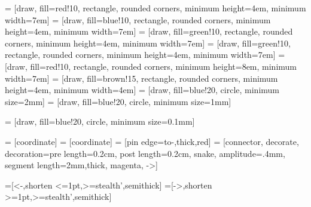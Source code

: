 \documentclass[runningheads]{llncs}
\newcommand{\0}{0}
\newcommand{\1}{1}
\begin{document}
 = [draw, fill=red!10, rectangle, rounded corners,
minimum height=4em, minimum width=7em]
 = [draw, fill=blue!10, rectangle, rounded corners,
minimum height=4em, minimum width=7em]
 = [draw, fill=green!10, rectangle, rounded corners,
minimum height=4em, minimum width=7em]
 = [draw, fill=green!10, rectangle, rounded corners,
minimum height=4em, minimum width=7em]
 = [draw, fill=red!10, rectangle, rounded corners,
minimum height=8em, minimum width=7em]
 = [draw, fill=brown!15, rectangle, rounded corners,
minimum height=4em, minimum width=4em]
 = [draw, fill=blue!20, circle, minimum size=2mm]
 = [draw, fill=blue!20, circle, minimum size=1mm]

 = [draw, fill=blue!20, circle, minimum size=0.1mm]

 = [coordinate]
 = [coordinate]
 = [pin edge={to-,thick,red}]
 = [connector, decorate, decoration={pre length=0.2cm,
	post length=0.2cm, snake, amplitude=.4mm,
	segment length=2mm},thick, magenta, ->]

=[<-,shorten <=1pt,>=stealth’,semithick]
=[->,shorten >=1pt,>=stealth’,semithick]
\end{document}
